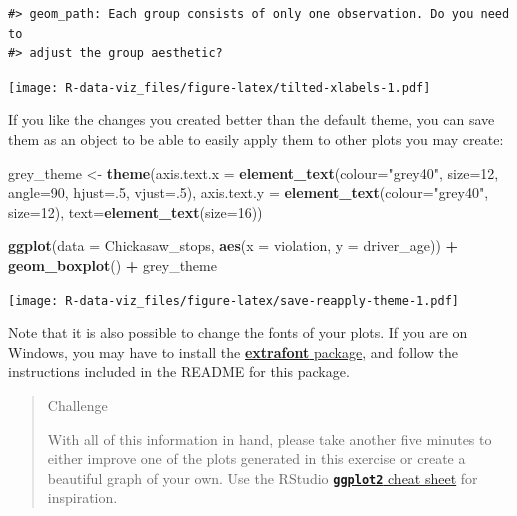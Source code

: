 \documentclass[]{book}
\newenvironment{Shaded}{\begin{snugshade}}{\end{snugshade}}
\newcommand{\KeywordTok}[1]{\textcolor[rgb]{0.13,0.29,0.53}{\textbf{#1}}}
\newcommand{\DataTypeTok}[1]{\textcolor[rgb]{0.13,0.29,0.53}{#1}}
\newcommand{\DecValTok}[1]{\textcolor[rgb]{0.00,0.00,0.81}{#1}}
\newcommand{\StringTok}[1]{\textcolor[rgb]{0.31,0.60,0.02}{#1}}
\newcommand{\OperatorTok}[1]{\textcolor[rgb]{0.81,0.36,0.00}{\textbf{#1}}}
\newcommand{\NormalTok}[1]{#1}
\theoremstyle{definition}
\theoremstyle{definition}
\theoremstyle{definition}
\theoremstyle{remark}
\begin{document}
\begin{verbatim}
#> geom_path: Each group consists of only one observation. Do you need to
#> adjust the group aesthetic?
\end{verbatim}

\texttt{[image: R-data-viz\_files/figure-latex/tilted-xlabels-1.pdf]}

If you like the changes you created better than the default theme, you
can save them as an object to be able to easily apply them to other
plots you may create:

\begin{Shaded}
\begin{Highlighting}[]
\NormalTok{grey_theme <-}\StringTok{ }\KeywordTok{theme}\NormalTok{(}\DataTypeTok{axis.text.x =} \KeywordTok{element_text}\NormalTok{(}\DataTypeTok{colour=}\StringTok{"grey40"}\NormalTok{, }\DataTypeTok{size=}\DecValTok{12}\NormalTok{, }\DataTypeTok{angle=}\DecValTok{90}\NormalTok{, }\DataTypeTok{hjust=}\NormalTok{.}\DecValTok{5}\NormalTok{, }\DataTypeTok{vjust=}\NormalTok{.}\DecValTok{5}\NormalTok{),}
                   \DataTypeTok{axis.text.y =} \KeywordTok{element_text}\NormalTok{(}\DataTypeTok{colour=}\StringTok{"grey40"}\NormalTok{, }\DataTypeTok{size=}\DecValTok{12}\NormalTok{), }\DataTypeTok{text=}\KeywordTok{element_text}\NormalTok{(}\DataTypeTok{size=}\DecValTok{16}\NormalTok{))}

\KeywordTok{ggplot}\NormalTok{(}\DataTypeTok{data =}\NormalTok{ Chickasaw_stops, }\KeywordTok{aes}\NormalTok{(}\DataTypeTok{x =}\NormalTok{ violation, }\DataTypeTok{y =}\NormalTok{ driver_age)) }\OperatorTok{+}
\StringTok{  }\KeywordTok{geom_boxplot}\NormalTok{() }\OperatorTok{+}\StringTok{ }
\StringTok{  }\NormalTok{grey_theme}
\end{Highlighting}
\end{Shaded}

\texttt{[image: R-data-viz\_files/figure-latex/save-reapply-theme-1.pdf]}

Note that it is also possible to change the fonts of your plots. If you
are on Windows, you may have to install the
\href{https://github.com/wch/extrafont}{\textbf{extrafont} package}, and
follow the instructions included in the README for this package.

\begin{quote}
Challenge

With all of this information in hand, please take another five minutes
to either improve one of the plots generated in this exercise or create
a beautiful graph of your own. Use the RStudio
\href{https://www.rstudio.com/wp-content/uploads/2016/11/ggplot2-cheatsheet-2.1.pdf}{\textbf{\texttt{ggplot2}}
cheat sheet} for inspiration.
\end{quote}
\end{document}
